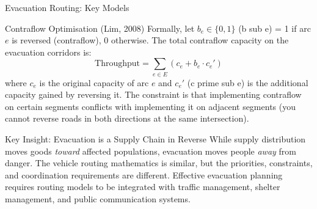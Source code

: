 \documentclass[aspectratio=169,10pt]{beamer}
\begin{document}
\begin{frame}[allowframebreaks]{Evacuation Routing: Key Models}
\begin{block}{Contraflow Optimisation (Lim, 2008)}
    Formally, let $b_e \in \{0,1\}$ (b sub e) = 1 if arc $e$ is
    reversed (contraflow), 0 otherwise.
    The total contraflow capacity on the evacuation corridors is:
    \[
      \text{Throughput} = \sum_{e \in E} \left( c_e + b_e \cdot c_e' \right)
    \]
    where $c_e$ is the original capacity of arc $e$ and $c_e'$
    (c prime sub e) is the additional capacity gained by reversing it.
    The constraint is that implementing contraflow on certain segments
    conflicts with implementing it on adjacent segments
    (you cannot reverse roads in both directions at the same intersection).
  \end{block}

  \medskip
  \begin{alertblock}{Key Insight: Evacuation is a Supply Chain in Reverse}
    While supply distribution moves goods \emph{toward} affected populations,
    evacuation moves people \emph{away} from danger.
    The vehicle routing mathematics is similar, but the priorities,
    constraints, and coordination requirements are different.
    Effective evacuation planning requires routing models to be
    integrated with traffic management, shelter management,
    and public communication systems.
  \end{alertblock}
\end{frame}
\end{document}
